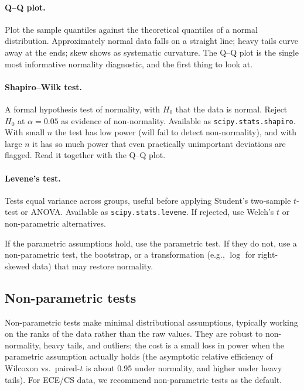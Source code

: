 \documentclass[11pt]{article}
\begin{document}
\paragraph{Q--Q plot.} Plot the sample quantiles against the theoretical quantiles of a normal distribution. Approximately normal data falls on a straight line; heavy tails curve away at the ends; skew shows as systematic curvature. The Q--Q plot is the single most informative normality diagnostic, and the first thing to look at.

\paragraph{Shapiro--Wilk test.} A formal hypothesis test of normality, with $H_0$ that the data is normal. Reject $H_0$ at $\alpha = 0.05$ as evidence of non-normality. Available as \texttt{scipy.stats.shapiro}. With small $n$ the test has low power (will fail to detect non-normality), and with large $n$ it has so much power that even practically unimportant deviations are flagged. Read it together with the Q--Q plot.

\paragraph{Levene's test.} Tests equal variance across groups, useful before applying Student's two-sample $t$-test or ANOVA. Available as \texttt{scipy.stats.levene}. If rejected, use Welch's $t$ or non-parametric alternatives.

If the parametric assumptions hold, use the parametric test. If they do not, use a non-parametric test, the bootstrap, or a transformation (e.g., $\log$ for right-skewed data) that may restore normality.

\subsection{Non-parametric tests}
\label{sec:nonparametric}

Non-parametric tests make minimal distributional assumptions, typically working on the ranks of the data rather than the raw values. They are robust to non-normality, heavy tails, and outliers; the cost is a small loss in power when the parametric assumption actually holds (the asymptotic relative efficiency of Wilcoxon vs.\ paired-$t$ is about 0.95 under normality, and higher under heavy tails). For ECE/CS data, we recommend non-parametric tests as the default.
\end{document}
